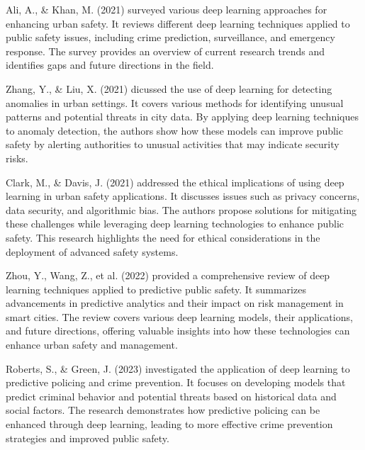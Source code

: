 \documentclass[conference]{IEEEtran}
\begin{document}
\cite{b10} Ali, A., & Khan, M. (2021) surveyed various deep learning approaches for enhancing urban safety. It reviews different deep learning techniques applied to public safety issues, including crime prediction, surveillance, and emergency response. The survey provides an overview of current research trends and identifies gaps and future directions in the field.

\cite{b11} Zhang, Y., & Liu, X. (2021) dicussed the use of deep learning for detecting anomalies in urban settings. It covers various methods for identifying unusual patterns and potential threats in city data. By applying deep learning techniques to anomaly detection, the authors show how these models can improve public safety by alerting authorities to unusual activities that may indicate security risks.

\cite{b12} Clark, M., & Davis, J. (2021) addressed the ethical implications of using deep learning in urban safety applications. It discusses issues such as privacy concerns, data security, and algorithmic bias. The authors propose solutions for mitigating these challenges while leveraging deep learning technologies to enhance public safety. This research highlights the need for ethical considerations in the deployment of advanced safety systems.

\cite{b13} Zhou, Y., Wang, Z., et al. (2022) provided a comprehensive review of deep learning techniques applied to predictive public safety. It summarizes advancements in predictive analytics and their impact on risk management in smart cities. The review covers various deep learning models, their applications, and future directions, offering valuable insights into how these technologies can enhance urban safety and management.

\cite{b14} Roberts, S., & Green, J. (2023) investigated the application of deep learning to predictive policing and crime prevention. It focuses on developing models that predict criminal behavior and potential threats based on historical data and social factors. The research demonstrates how predictive policing can be enhanced through deep learning, leading to more effective crime prevention strategies and improved public safety.
\end{document}
